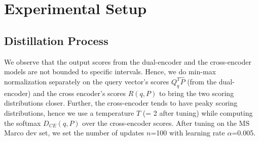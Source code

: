 \section{Experimental Setup}
\label{sec:exp_setup}
\subsection{Distillation Process} We observe that the output scores from the dual-encoder and the cross-encoder models are not bounded to specific intervals. Hence, we do min-max normalization separately on the query vector's scores $Q^T_q\hat{P}$ (from the dual-encoder) and the cross encoder's scores $R(q,P)$ to bring the two scoring distributions closer. Further, the cross-encoder tends to have peaky scoring distributions, hence we use a temperature $T$ (= 2 after tuning) while computing the softmax $D_{CE}(q,P)$ over the cross-encoder scores. After tuning on the MS Marco dev set, we set the number of updates $n$=100 with learning rate $\alpha$=0.005.

